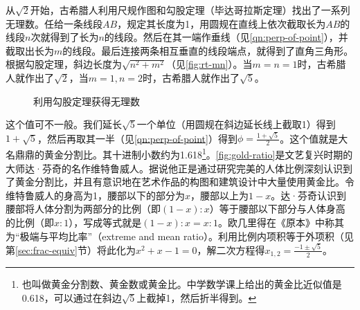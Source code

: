\documentclass[b5paper]{ctexart}
\begin{document}
从$\sqrt{2}$开始，古希腊人利用尺规作图和勾股定理（毕达哥拉斯定理）找出了一系列无理数。任给一条线段$AB$，规定其长度为1，用圆规在直线上依次截取长为$AB$的线段$n$次就得到了长为$n$的线段。然后在其一端作垂线（见\cref{qn:perp-of-point}），并截取出长为$m$的线段。最后连接两条相互垂直的线段端点，就得到了直角三角形。根据勾股定理，斜边长度为$\sqrt{n^2 + m^2}$（见\cref{fig:rt-mn}）。当$m = n = 1$时，古希腊人就作出了$\sqrt{2}$，当$m=1, n=2$时，古希腊人就作出了$\sqrt{5}$。

\begin{figure}[htbp]
  \centering
  \caption{利用勾股定理获得无理数}
  \label{fig:irrational-tagent}
\end{figure}

 
这个值可不一般。我们延长$\sqrt{5}$一个单位（用圆规在斜边延长线上截取1）得到$1 + \sqrt{5}$，然后再取其一半（见\cref{qn:perp-of-point}）得到$\phi = \frac{1 + \sqrt{5}}{2}$。这个值就是大名鼎鼎的黄金分割比。其十进制小数约为1.618\footnote{也叫做黄金分割数、黄金数或黄金比。中学数学课上给出的黄金比近似值是0.618，可以通过在斜边$\sqrt{5}$上截掉1，然后折半得到。}。\cref{fig:gold-ratio}是文艺复兴时期的大师达·芬奇的名作维特鲁威人。据说他正是通过研究完美的人体比例深刻认识到了黄金分割比，并且有意识地在艺术作品的构图和建筑设计中大量使用黄金比。令维特鲁威人的身高为1，腰部以下的部分为$x$，腰部以上为$1 - x$。达·芬奇认识到腰部将人体分割为两部分的比例（即$(1 - x) : x$）等于腰部以下部分与人体身高的比例（即$x : 1$），写成等式就是$(1 - x) : x = x : 1$。欧几里得在《原本》中称其为“极端与平均比率”（extreme and mean ratio）。利用比例内项积等于外项积（见第\ref{sec:frac-equiv}节）将此化为$x^2 + x - 1 = 0$，解二次方程得$x_{1, 2} = \frac{-1 \pm \sqrt{5}}{2}$。
\end{document}
